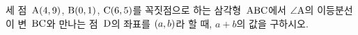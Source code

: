 세 점~$\mathrm{A}(4{,}\mkern3mu\mathopen{}9)$, $\mathrm{B}(0{,}\mkern3mu\mathopen{}1)$, $\mathrm{C}(6{,}\mkern3mu\mathopen{}5)$를 꼭짓점으로 하는 삼각형~$\mathrm{ABC}$에서 $\angle\mathrm{A}$의 이등분선이 변~$\mathrm{BC}$와 만나는 점~$\mathrm{D}$의 좌표를 $(a{,}\mkern3mu\mathopen{}b)$라 할 때, $a+b$의 값을 구하시오.
